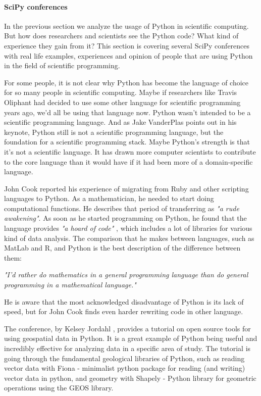 \paragraph{SciPy conferences} 
\label{SciPy}

In the previous section we analyze the usage of Python in scientific computing. But how does researchers and scientists see the Python code? What kind of experience they gain from it? This section is covering several SciPy conferences with real life examples, experiences and opinion of people that are using Python in the field of scientific programming.

For some people, it is not clear why Python has become the language of choice for so many people in scientific computing. Maybe if researchers like Travis Oliphant had decided to use some other language for scientific programming years ago, we’d all be using that language now. Python wasn’t intended to be a scientific programming language. And as Jake VanderPlas points out in his keynote, Python still is not a scientific programming language, but the foundation for a scientific programming stack. Maybe Python’s strength is that it’s not a scientific language. It has drawn more computer scientists to contribute to the core language than it would have if it had been more of a domain-specific language.

John Cook reported his experience of migrating from Ruby and other scripting languages to Python. As a mathematician, he needed to start doing computational functions. He describes that period of transferring as \textit{"a rude awakening"}.\cite{johnSciPy} As soon as he started programming on Python, he found that the language provides \textit{"a hoard of code"} \cite{johnSciPy}, which includes a lot of libraries for various kind of data analysis. The comparison that he makes between languages, such as MatLab and R, and Python is the best description of the difference between them:

\textit{"I’d rather do mathematics in a general programming language than do general programming in a mathematical language."}

He is aware that the most acknowledged disadvantage of Python is its lack of speed, but for John Cook finds even harder rewriting code in other language. 

The conference, by Kelsey Jordahl \cite{efficientPython}, provides a tutorial on open source tools for using geospatial data in Python. It is a great example of Python being useful and incredibly effective for analyzing data in a specific area of study. The tutorial is going through the fundamental geological libraries of Python, such as reading vector data with Fiona - minimalist python package for reading (and writing) vector data in python, and geometry with Shapely - Python library for geometric operations using the GEOS library. 

